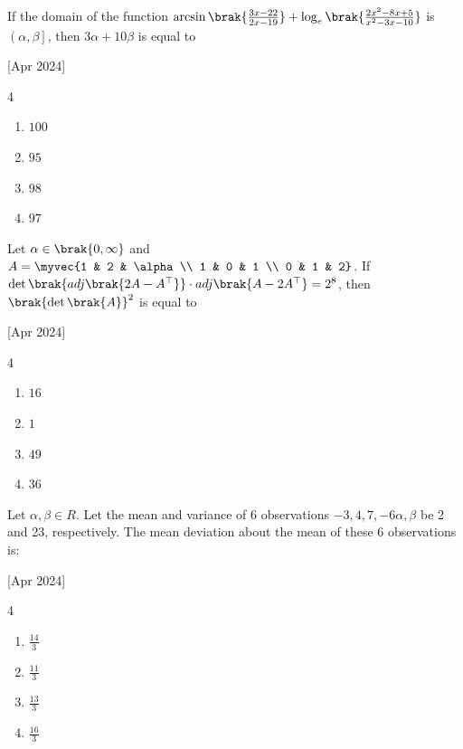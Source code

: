     \item If the domain of the function $\arcsin\brak{\frac{3x-22}{2x-19}}+\log_e\brak{\frac{2x^2-8x+5}{x^2-3x-10}}$ is $\left(\alpha,\beta\right]$, then $3\alpha+10\beta$ is equal to
    
    \hfill{[Apr 2024]}

        \begin{multicols}{4}
            \begin{enumerate}
                \item $100$
                \item $95$
                \item $98$
                \item $97$
            \end{enumerate}
        \end{multicols}

    \item Let $\alpha\in\brak{0,\infty}$ and $A=\myvec{1 & 2 & \alpha \\ 1 & 0 & 1 \\ 0 & 1 & 2}$. If $\det\brak{adj\brak{2A-A^\top}}\cdot adj\brak{A-2A^\top}=2^8$, then $\brak{\det\brak{A}}^2$ is equal to
    
    \hfill{[Apr 2024]}

        \begin{multicols}{4}
            \begin{enumerate}
                \item $16$
                \item $1$
                \item $49$
                \item $36$
            \end{enumerate}
        \end{multicols}
        
    \item Let $\alpha,\beta\in R$. Let the mean and variance of 6 observations $-3,4,7,-6\alpha,\beta$ be 2 and 23, respectively. The mean deviation about the mean of these 6 observations is:
    
    \hfill{[Apr 2024]}

        \begin{multicols}{4}
            \begin{enumerate}
                \item $\frac{14}{3}$
                \item $\frac{11}{3}$
                \item $\frac{13}{3}$
                \item $\frac{16}{3}$
            \end{enumerate}
        \end{multicols}

